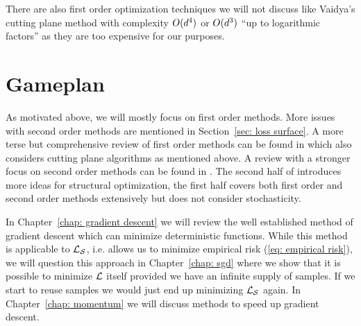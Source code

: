There are also first order optimization techniques we will not discuss like
Vaidya's cutting plane method
\parencite[e.g.][]{bubeckConvexOptimizationAlgorithms2015} with complexity
\(O(d^4)\) or \(O(d^3)\) ``up to logarithmic factors''
\parencite[Section 2.3]{bubeckConvexOptimizationAlgorithms2015} as they are
too expensive for our purposes.

\section{Gameplan}

As motivated above, we will mostly focus on first order methods. More
issues with second order methods are mentioned in Section~\ref{sec: loss
surface}. A more terse but comprehensive review of first order methods can be found in
\textcite{bubeckConvexOptimizationAlgorithms2015} which also considers cutting
plane algorithms as mentioned above. A review with a stronger focus on second
order methods can be found in
\textcite{bottouOptimizationMethodsLargeScale2018}. The second half of
\textcite{nesterovLecturesConvexOptimization2018} introduces more ideas for
structural optimization, the first half covers both first order and second
order methods extensively but does not consider stochasticity.

In Chapter~\ref{chap: gradient descent} we will review the well
established method of gradient descent which can minimize deterministic
functions. While this method is applicable to \(\mathcal{L}_{\mathcal{S}}\), i.e. allows us
to minimize empirical risk (\ref{eq: empirical risk}), we will question this
approach in Chapter~\ref{chap: sgd} where we show that it is possible to
minimize \(\mathcal{L}\) itself provided we have an infinite supply of samples. If we
start to reuse samples we would just end up minimizing \(\mathcal{L}_{\mathcal{S}}\) again.
In Chapter~\ref{chap: momentum} we will discuss methods to speed up
gradient descent.



\endinput
